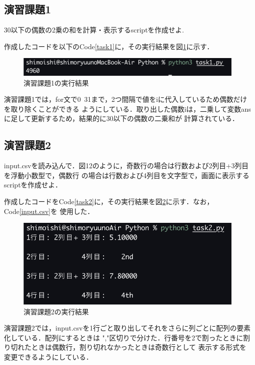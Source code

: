 \documentclass[a4paper,11pt]{jsarticle}
\begin{document}
\subsection{演習課題1}
  \begin{screen}
  30以下の偶数の2乗の和を計算・表示するscriptを作成せよ.
  \end{screen}
  作成したコードを以下のCode\ref{task1}に，その実行結果を図\ref{task1ans}に示す．
  
  \begin{figure}[H]
    \centering 
    \includegraphics[width=0.8\linewidth]{Experiment_photo/task1.png}
    \caption{演習課題1の実行結果}
    \label{task1ans}
  \end{figure}
  演習課題1では，for文で0~31まで，2つ間隔で値をiに代入しているため偶数だけを取り除くことができる
  ようにしている．取り出した偶数iは，二乗して変数ansに足して更新するため，結果的に30以下の偶数の二乗和が
  計算されている．

\subsection{演習課題2}
  \begin{screen}
  input.csvを読み込んで．図12のように，奇数行の場合は行数および2列目+3列目を浮動小数型で，偶数行
  の場合は行数および4列目を文字型で，画面に表示するscriptを作成せよ．
  \end{screen}
  作成したコードをCode\ref{task2}に，その実行結果を図\ref{task2ans}に示す．なお，Code\ref{input.csv}を
  使用した．
  
  \begin{figure}[H]
    \centering
    \includegraphics[width=0.8\linewidth]{Experiment_photo/task2.png}
    \caption{演習課題2の実行結果}
    \label{task2ans}
  \end{figure}
  演習課題2では，input.csvを1行ごと取り出してそれをさらに列ごとに配列の要素化している．配列にするときは
  ","区切りで分けた．行番号を2で割ったときに割り切れたときは偶数行，割り切れなかったときは奇数行として
  表示する形式を変更できるようにしている．
\end{document}
